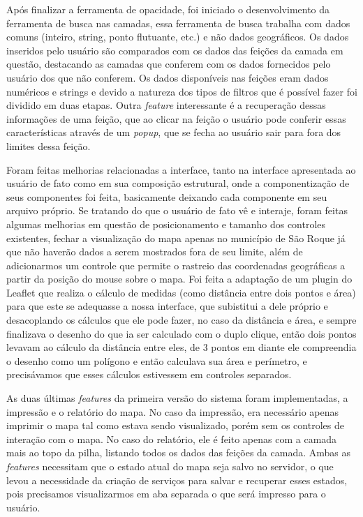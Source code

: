 \documentclass{ufscar}
\begin{document}
Após finalizar a ferramenta de opacidade, foi iniciado o desenvolvimento da ferramenta de busca nas camadas, essa ferramenta de busca trabalha com dados comuns (inteiro, string, ponto flutuante, etc.) e não dados geográficos. Os dados inseridos pelo usuário são comparados com os dados das feições da camada em questão, destacando as camadas que conferem com os dados fornecidos pelo usuário dos que não conferem. Os dados disponíveis nas feições eram dados numéricos e strings e devido a natureza dos tipos de filtros que é possível fazer foi dividido em duas etapas. Outra \textit{feature} interessante é a recuperação dessas informações de uma feição, que ao clicar na feição o usuário pode conferir essas características através de um \textit{popup}, que se fecha ao usuário sair para fora dos limites dessa feição.

Foram feitas melhorias relacionadas a interface, tanto na interface apresentada ao usuário de fato como em sua composição estrutural, onde a componentização de seus componentes foi feita, basicamente deixando cada componente em seu arquivo próprio. Se tratando do que o usuário de fato vê e interaje, foram feitas algumas melhorias em questão de posicionamento e tamanho dos controles existentes, fechar a visualização do mapa apenas no município de São Roque já que não haverão dados a serem mostrados fora de seu limite, além de adicionarmos um controle que permite o rastreio das coordenadas geográficas a partir da posição do mouse sobre o mapa. Foi feita a adaptação de um plugin do Leaflet que realiza o cálculo de medidas (como distância entre dois pontos e área) para que este se adequasse a nossa interface, que subistitui a dele próprio e desacoplando os cálculos que ele pode fazer, no caso da distância e área, e sempre finalizava o desenho do que ia ser calculado com o duplo clique, então dois pontos levavam ao cálculo da distância entre eles, de 3 pontos em diante ele compreendia o desenho como um polígono e então calculava sua área e perímetro, e precisávamos que esses cálculos estivessem em controles separados.

As duas últimas \textit{features} da primeira versão do sistema foram implementadas, a impressão e o relatório do mapa. No caso da impressão, era necessário apenas imprimir o mapa tal como estava sendo visualizado, porém sem os controles de interação com o mapa. No caso do relatório, ele é feito apenas com a camada mais ao topo da pilha, listando todos os dados das feições da camada. Ambas as \textit{features} necessitam que o estado atual do mapa seja salvo no servidor, o que levou a necessidade da criação de serviços para salvar e recuperar esses estados, pois precisamos visualizarmos em aba separada o que será impresso para o usuário.
\end{document}

